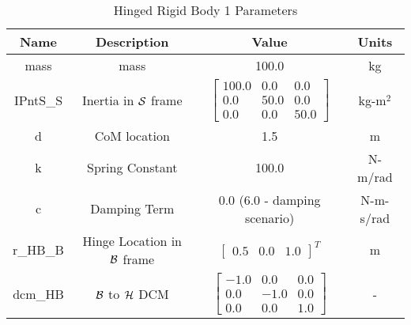 \begin{table}[htbp]
	\caption{Hinged Rigid Body 1 Parameters}
	\label{tab:panel1}
	\centering \fontsize{10}{10}\selectfont
	\begin{tabular}{| c | c | c | c |} %
		\hline
		\textbf{Name}  & \textbf{Description}  & \textbf{Value} & \textbf{Units} \\
		\hline
		mass  & mass & 100.0 & kg \\
		\hline
		IPntS\_S & Inertia in $\cal{S}$ frame & $\begin{bmatrix}
			100.0 & 0.0 & 0.0\\
			0.0 & 50.0 & 0.0\\
			0.0 & 0.0 & 50.0
		\end{bmatrix}$ & kg-m$^2$ \\
		\hline
		d & CoM location & 1.5 & m \\
		\hline
		k & Spring Constant & 100.0 & N-m/rad \\
		\hline
		c & Damping Term & 0.0 (6.0 - damping scenario) & N-m-s/rad \\
		\hline
		r\_HB\_B & Hinge Location in $\cal{B}$ frame & $\begin{bmatrix}
		0.5 & 0.0 & 1.0 \end{bmatrix}^T$ & m \\
\hline
		dcm\_HB & $\cal{B}$ to $\cal{H}$ DCM & $\begin{bmatrix}
		-1.0 & 0.0 & 0.0\\
		0.0 & -1.0 & 0.0\\
		0.0 & 0.0 & 1.0
		\end{bmatrix}$ & - \\
\hline
	\end{tabular}
\end{table}

